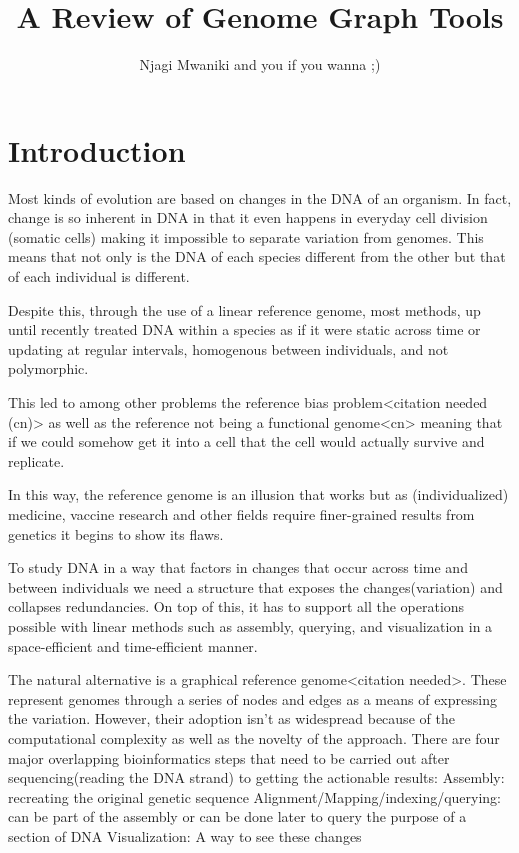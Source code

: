 \documentclass[11pt]{article}
\author{Njagi Mwaniki and you if you wanna ;)}
\date{}
\title{A Review of Genome Graph Tools}
\begin{document}
\maketitle
\tableofcontents

\newpage
\section{Introduction}
\label{sec:org62241b9}
Most kinds of evolution are based on changes in the DNA of an organism. In fact, change is so inherent in DNA in that it even happens in everyday cell division (somatic cells) making it impossible to separate variation from genomes. This means that not only is the DNA of each species different from the other but that of each individual is different.

Despite this, through the use of a linear reference genome, most methods, up until recently treated DNA within a species as if it were static across time or updating at regular intervals, homogenous between individuals, and not polymorphic.

This led to among other problems the reference bias problem<citation needed (cn)> as well as the reference not being a functional genome<cn> meaning that if we could somehow get it into a cell that the cell would actually survive and replicate. 

In this way, the reference genome is an illusion that works but as (individualized) medicine, vaccine research and other fields require finer-grained results from genetics it begins to show its flaws.

To study DNA in a way that factors in changes that occur across time and between individuals we need a structure that exposes the changes(variation) and collapses redundancies. On top of this, it has to support all the operations possible with linear methods such as assembly, querying, and visualization in a space-efficient and time-efficient manner.

The natural alternative is a graphical reference genome<citation needed>. These represent genomes through a series of nodes and edges as a means of expressing the variation.
However, their adoption isn’t as widespread because of the computational complexity as well as the novelty of the approach.
There are four major overlapping bioinformatics steps that need to be carried out after sequencing(reading the DNA strand) to getting the actionable results: 
Assembly: recreating the original genetic sequence
Alignment/Mapping/indexing/querying: can be part of the assembly or can be done later to query the purpose of a section of DNA
Visualization: A way to see these changes
\end{document}
